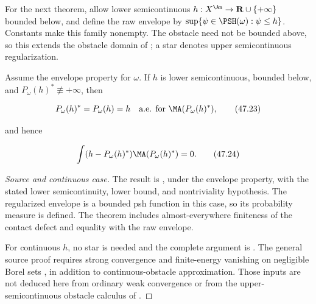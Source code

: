 For the next theorem, allow lower semicontinuous
$h:X^{\An}\to\mathbf R\cup\{+\infty\}$ bounded below, and define the
raw envelope by $\sup\{\psi\in\PSH(\omega):\psi\le h\}$.
Constants make this family nonempty. The obstacle need not be bounded
above, so this extends the obstacle domain of
; a star denotes upper semicontinuous
regularization.

\begin{theorem}\label{thm:bj-obstacle-orthogonality-energy}
Assume the envelope property for $\omega$.  If $h$ is lower
semicontinuous, bounded below, and $P_\omega(h)^*\not\equiv+\infty$, then

\[
 P_\omega(h)^*=P_\omega(h)=h
 \quad\text{a.e. for }\MA(P_\omega(h)^*),
\tag{47.23}\label{eq:bj-obstacle-contact}
\]

and hence

\[
 \int(h-P_\omega(h)^*)\MA(P_\omega(h)^*)=0.
\tag{47.24}\label{eq:bj-obstacle-orthogonality}
\]
\end{theorem}

\begin{proof}[Source and continuous case]
The result is \cite[Theorem~13.1]{BJ22}, under the envelope property,
with the stated lower semicontinuity, lower bound, and nontriviality
hypothesis. The regularized envelope is a bounded psh function in this
case, so its probability measure is defined. The theorem includes
almost-everywhere finiteness of the contact defect and equality with
the raw envelope.

For continuous $h$, no star is needed and the complete argument is
. The general source proof requires
strong convergence and finite-energy vanishing on negligible Borel sets
\cite[Lemma~13.2]{BJ22}, in addition to
continuous-obstacle approximation. Those inputs are not deduced here
from ordinary weak convergence or from the upper-semicontinuous obstacle
calculus of .
\end{proof}

